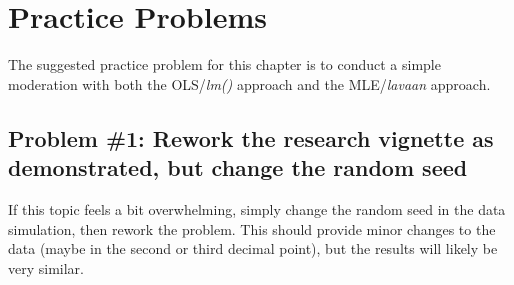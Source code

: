 \documentclass[
]{book}
\begin{document}
\hypertarget{practice-problems-6}{%
\section{Practice Problems}\label{practice-problems-6}}

The suggested practice problem for this chapter is to conduct a simple moderation with both the OLS/\emph{lm()} approach and the MLE/\emph{lavaan} approach.

\hypertarget{problem-1-rework-the-research-vignette-as-demonstrated-but-change-the-random-seed-2}{%
\subsection{Problem \#1: Rework the research vignette as demonstrated, but change the random seed}\label{problem-1-rework-the-research-vignette-as-demonstrated-but-change-the-random-seed-2}}

If this topic feels a bit overwhelming, simply change the random seed in the data simulation, then rework the problem. This should provide minor changes to the data (maybe in the second or third decimal point), but the results will likely be very similar.
\end{document}
